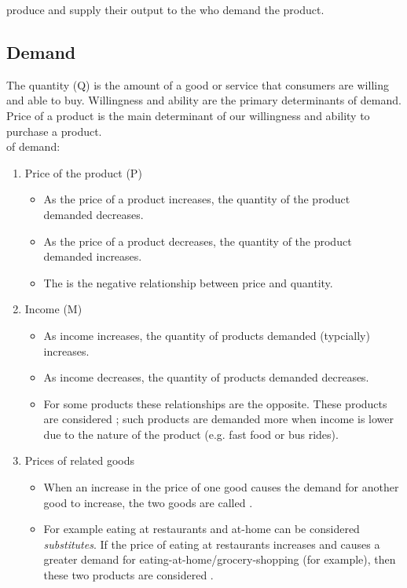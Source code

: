 \documentclass{article}
\begin{document}
 produce and supply their output to the  who demand the product. 

\subsection{Demand}

The quantity (Q)  is the amount of a good or service that consumers are willing and able to buy. Willingness and ability are the primary determinants of demand. Price of a product is the main determinant of our willingness and ability to purchase a product. \\ 

 of demand: 
\begin{enumerate}
  \item Price of the product (P) \\ 
    \begin{itemize}
      \item As the price of a product increases, the quantity of the product demanded decreases. \\ 
      \item As the price of a product decreases, the quantity of the product demanded increases. \\ 
      \item The  is the negative relationship between price and quantity. 
    \end{itemize}
  \item Income (M)
    \begin{itemize}
      \item As income increases, the quantity of products demanded (typcially) increases. 
      \item As income decreases, the quantity of products demanded decreases. 
      \item For some products these relationships are the opposite. These products are considered ; such products are demanded more when income is lower due to the nature of the product (e.g. fast food or bus rides). 
    \end{itemize}
  \item Prices of related goods 
    \begin{itemize}
      \item When an increase in the price of one good causes the demand for another good to increase, the two goods are called . 
      \item For example eating at restaurants and at-home can be considered \emph{substitutes}. If the price of eating at restaurants increases and causes a greater demand for eating-at-home/grocery-shopping (for example), then these two products are considered . 

\end{itemize}
\end{enumerate}
\end{document}
